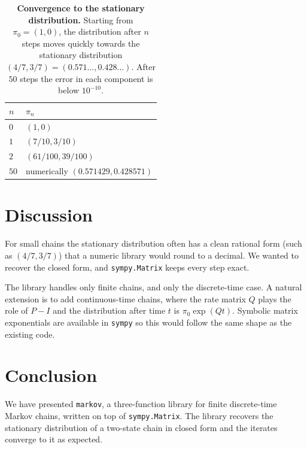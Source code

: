 \documentclass[11pt]{article}
\begin{document}
\begin{table}[h]
\centering
\begin{tabular}{l l}
\toprule
\(n\) & \(\pi_n\) \\
\midrule
\(0\)  & \((1, 0)\) \\
\(1\)  & \((7/10, 3/10)\) \\
\(2\)  & \((61/100, 39/100)\) \\
\(50\) & numerically \((0.571429, 0.428571)\) \\
\bottomrule
\end{tabular}
\caption{\textbf{Convergence to the stationary distribution.}
Starting from \(\pi_0 = (1, 0)\), the distribution after \(n\) steps
moves quickly towards the stationary distribution \((4/7, 3/7) =
(0.571\dots, 0.428\dots)\). After \(50\) steps the error in each
component is below \(10^{-10}\).}
\label{tab:steps}
\end{table}

\section{Discussion}

For small chains the stationary
distribution often has a clean rational form (such as \((4/7, 3/7)\))
that a numeric library would round to a decimal. We wanted to recover
the closed form, and \texttt{sympy.Matrix} keeps every step exact.

The library handles only finite chains, and only
the discrete-time case. A natural extension is to add continuous-time
chains, where the rate matrix \(Q\) plays the role of \(P - I\) and
the distribution after time \(t\) is \(\pi_0 \exp(Q t)\). Symbolic
matrix exponentials are available in \texttt{sympy} so this would
follow the same shape as the existing code.

\section{Conclusion}

We have presented \texttt{markov}, a three-function library for
finite discrete-time Markov chains, written on top of
\texttt{sympy.Matrix}. The library recovers the stationary
distribution of a two-state chain in closed form and the iterates
converge to it as expected.



\end{document}
